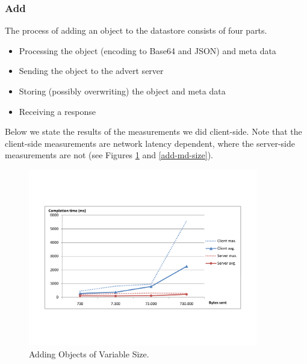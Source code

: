 \subsubsection{Add}
The process of adding an object to the datastore consists of four parts.

\begin{itemize}
  \item Processing the object (encoding to Base64 and JSON) and meta data
  \item Sending the object to the advert server
  \item Storing (possibly overwriting) the object and meta data
  \item Receiving a response
\end{itemize}

Below we state the results of the measurements we did client-side. Note that
the client-side measurements are network latency dependent, where the
server-side measurements are not (see Figures \ref{add-obj-size} and
\ref{add-md-size}).

\begin{figure} %
\begin{center}
\includegraphics[trim=5cm 4cm 5cm 5cm,width=10cm]{./figures/add_obj.pdf}
\caption{Adding Objects of Variable Size. \label{add-obj-size}}
\end{center}
\end{figure}

